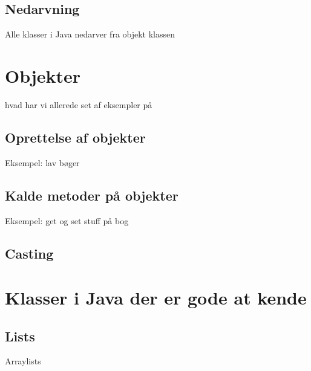 \subsection{Nedarvning}

Alle klasser i Java nedarver fra objekt klassen

\section{Objekter}

hvad har vi allerede set af eksempler på

\subsection{Oprettelse af objekter}

Eksempel: lav bøger

\subsection{Kalde metoder på objekter}

Eksempel: get og set stuff på bog

\subsection{Casting}

\section{Klasser i Java der er gode at kende}

\subsection{Lists}

Arraylists

